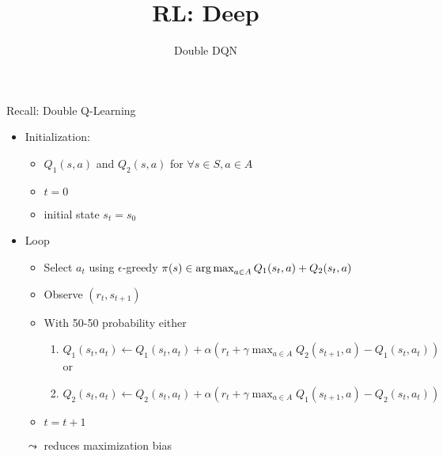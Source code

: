 


\title[RL: Deep Reinforcement Learning]{RL: Deep}
\subtitle{Double DQN}




	
	\maketitle

\begin{frame}[c]{Recall: Double Q-Learning}
	
	\begin{itemize}
		\item Initialization:
		\begin{itemize}
			\item $Q_1(s,a)$ and $Q_2(s,a)$ for $\forall s \in S, a\in A$
			\item $t= 0$
			\item initial state $s_t = s_0$
		\end{itemize}
		\item Loop
		\begin{itemize}
			\item Select $a_t$ using $\epsilon$-greedy $\pi(s) \in \operatorname*{arg\,max}_{a \in A} Q_1(s_t, a) + Q_2(s_t , a)$
			\item Observe $(r_t, s_{t+1})$
			\item With 50-50 probability either
			\begin{enumerate}
				\item $Q_1(s_t, a_t) \gets Q_1(s_t, a_t) + \alpha (r_t +\gamma \max_{a\in A} Q_2(s_{t+1}, a) - Q_1(s_t, a_t))$\\
				or
				\item $Q_2(s_t, a_t) \gets Q_2(s_t, a_t) + \alpha (r_t +\gamma \max_{a\in A} Q_1(s_{t+1}, a) - Q_2(s_t, a_t))$
			\end{enumerate}
			\item $t = t + 1 $
		\end{itemize}
	
		\bigskip
		\pause
		\item[$\leadsto$] reduces maximization bias
	\end{itemize}
	
\end{frame}
